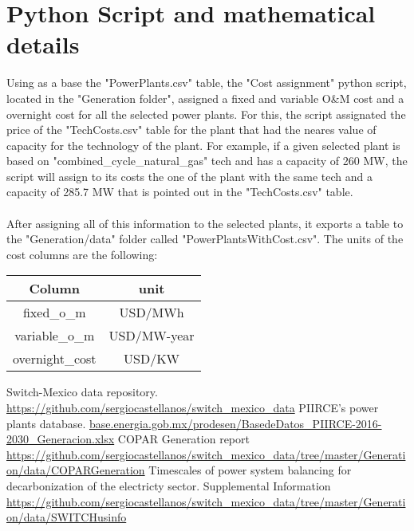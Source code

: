 \documentclass[letterpaper,12pt]{article}
\begin{document}
\section{Python Script and mathematical details}
Using as a base the "PowerPlants.csv" table, the "Cost assignment" python script, located in the "Generation folder", assigned a fixed and variable O\&M cost and a overnight cost for all the selected power plants. For this, the script assignated the price of the "TechCosts.csv" table for the plant that had the neares value of capacity for the technology of the plant. For example, if a given selected plant is based on "combined\_cycle\_natural\_gas" tech and has a capacity of 260 MW, the script will assign to its costs the one of the plant with the same tech and a capacity of 285.7 MW that is pointed out in the "TechCosts.csv" table. 
\\
\\After assigning all of this information to the selected plants, it exports a table to the "Generation/data" folder called "PowerPlantsWithCost.csv". The units of the cost columns are the following:
\begin{center}
\begin{tabular}{|c|c|}
\hline
Column & unit \\
\hline
fixed\_o\_m & USD/MWh \\
variable\_o\_m & USD/MW-year \\
overnight\_cost & USD/KW \\
\hline
\end{tabular}
\end{center}
\begin{thebibliography}{9}
 Switch-Mexico data repository. \url{https://github.com/sergiocastellanos/switch_mexico_data}
PIIRCE's power plants database. \url{base.energia.gob.mx/prodesen/BasedeDatos_PIIRCE-2016-2030_Generacion.xlsx}
 COPAR Generation report \url{https://github.com/sergiocastellanos/switch_mexico_data/tree/master/Generation/data/COPARGeneration}
Timescales of power system balancing for decarbonization of the electricty sector. Supplemental Information \url{https://github.com/sergiocastellanos/switch_mexico_data/tree/master/Generation/data/SWITCHusinfo}
\end{thebibliography}
\end{document}
